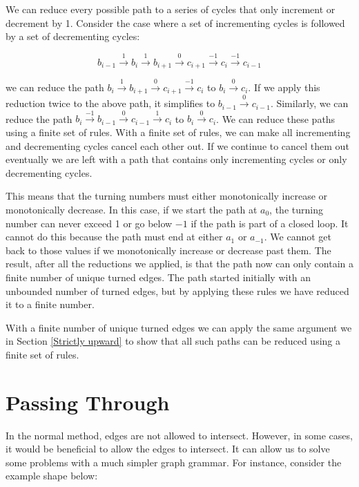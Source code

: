 \documentclass[acmtog]{acmart}
\begin{document}
We can reduce every possible path to a series of cycles that only increment or
decrement by 1. Consider the case where a set of incrementing cycles is followed
by a set of decrementing cycles:

\begin{equation}
\label{incrementing}
b_{i-1} \xrightarrow{1} b_i \xrightarrow{1} b_{i+1} \xrightarrow{0} c_{i+1} \xrightarrow{-1} c_{i} \xrightarrow{-1} c_{i-1} 
\end{equation}

\noindent we can reduce the path $b_i \xrightarrow{1} b_{i+1} \xrightarrow{0} c_{i+1} \xrightarrow{-1} c_{i}$
to $b_i \xrightarrow{0} c_{i}$. If we apply this reduction twice to the above
path, it simplifies to $b_{i-1} \xrightarrow{0} c_{i-1}$. Similarly, we can reduce the
path $b_i \xrightarrow{-1} b_{i-1} \xrightarrow{0} c_{i-1} \xrightarrow{1} c_{i}$
to $b_i \xrightarrow{0} c_{i}$. We can reduce these paths using a finite set of
rules. With a finite set of rules, we can make all incrementing and decrementing
cycles cancel each other out. If we continue to cancel them out eventually we are left
with a path that contains only incrementing cycles or only decrementing cycles.

This means that the turning numbers must either monotonically increase or 
monotonically decrease. In this case, if we start the path at $a_0$, the 
turning number can never exceed 1 or go below $-1$ if the path is part of a 
closed loop. It cannot do this because the path must end at either $a_1$ 
or $a_{-1}$. We cannot get back to those values if we monotonically increase 
or decrease past them. The result, after all the reductions we applied, is that
the path now can only contain a finite number of unique turned edges. The path
started initially with an unbounded number of turned edges, but by applying these rules we have reduced 
it to a finite number.

With a finite number of unique turned edges we can apply the same argument we
in Section \ref{Strictly upward} to show that all such paths can be reduced
using a finite set of rules.

\section{Passing Through}

In the normal method, edges are not allowed to intersect. However, in some 
cases, it would be beneficial to allow the edges to intersect. It can allow 
us to solve some problems with a much simpler graph grammar. For instance, 
consider the example shape below:
\end{document}

